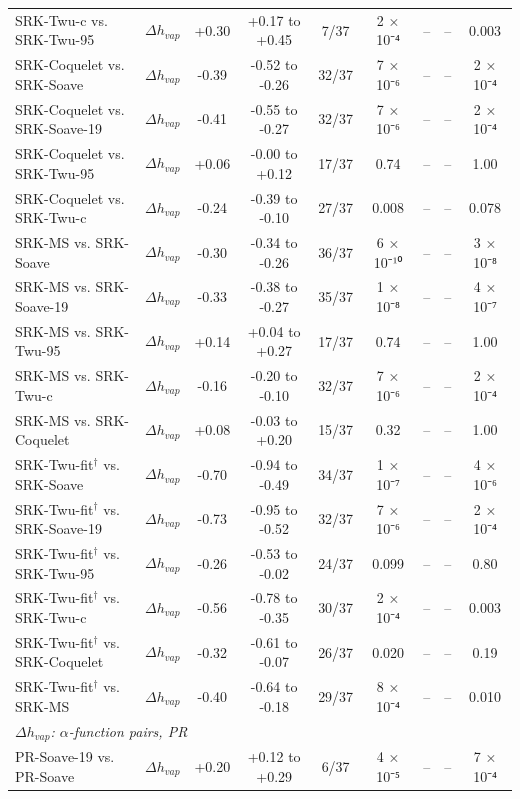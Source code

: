 \begin{table}[H]
\begin{tabular}{llccccccc}
SRK-Twu-c vs. SRK-Twu-95 & $\Delta h_{vap}$ & +0.30 & +0.17 to +0.45 & 7/37 & 2 × 10⁻⁴ & -- & -- & 0.003 \\
SRK-Coquelet vs. SRK-Soave & $\Delta h_{vap}$ & -0.39 & -0.52 to -0.26 & 32/37 & 7 × 10⁻⁶ & -- & -- & 2 × 10⁻⁴ \\
SRK-Coquelet vs. SRK-Soave-19 & $\Delta h_{vap}$ & -0.41 & -0.55 to -0.27 & 32/37 & 7 × 10⁻⁶ & -- & -- & 2 × 10⁻⁴ \\
SRK-Coquelet vs. SRK-Twu-95 & $\Delta h_{vap}$ & +0.06 & -0.00 to +0.12 & 17/37 & 0.74 & -- & -- & 1.00 \\
SRK-Coquelet vs. SRK-Twu-c & $\Delta h_{vap}$ & -0.24 & -0.39 to -0.10 & 27/37 & 0.008 & -- & -- & 0.078 \\
SRK-MS vs. SRK-Soave & $\Delta h_{vap}$ & -0.30 & -0.34 to -0.26 & 36/37 & 6 × 10⁻¹⁰ & -- & -- & 3 × 10⁻⁸ \\
SRK-MS vs. SRK-Soave-19 & $\Delta h_{vap}$ & -0.33 & -0.38 to -0.27 & 35/37 & 1 × 10⁻⁸ & -- & -- & 4 × 10⁻⁷ \\
SRK-MS vs. SRK-Twu-95 & $\Delta h_{vap}$ & +0.14 & +0.04 to +0.27 & 17/37 & 0.74 & -- & -- & 1.00 \\
SRK-MS vs. SRK-Twu-c & $\Delta h_{vap}$ & -0.16 & -0.20 to -0.10 & 32/37 & 7 × 10⁻⁶ & -- & -- & 2 × 10⁻⁴ \\
SRK-MS vs. SRK-Coquelet & $\Delta h_{vap}$ & +0.08 & -0.03 to +0.20 & 15/37 & 0.32 & -- & -- & 1.00 \\
SRK-Twu-fit$^{\dagger}$ vs. SRK-Soave & $\Delta h_{vap}$ & -0.70 & -0.94 to -0.49 & 34/37 & 1 × 10⁻⁷ & -- & -- & 4 × 10⁻⁶ \\
SRK-Twu-fit$^{\dagger}$ vs. SRK-Soave-19 & $\Delta h_{vap}$ & -0.73 & -0.95 to -0.52 & 32/37 & 7 × 10⁻⁶ & -- & -- & 2 × 10⁻⁴ \\
SRK-Twu-fit$^{\dagger}$ vs. SRK-Twu-95 & $\Delta h_{vap}$ & -0.26 & -0.53 to -0.02 & 24/37 & 0.099 & -- & -- & 0.80 \\
SRK-Twu-fit$^{\dagger}$ vs. SRK-Twu-c & $\Delta h_{vap}$ & -0.56 & -0.78 to -0.35 & 30/37 & 2 × 10⁻⁴ & -- & -- & 0.003 \\
SRK-Twu-fit$^{\dagger}$ vs. SRK-Coquelet & $\Delta h_{vap}$ & -0.32 & -0.61 to -0.07 & 26/37 & 0.020 & -- & -- & 0.19 \\
SRK-Twu-fit$^{\dagger}$ vs. SRK-MS & $\Delta h_{vap}$ & -0.40 & -0.64 to -0.18 & 29/37 & 8 × 10⁻⁴ & -- & -- & 0.010 \\
\multicolumn{9}{l}{\emph{$\Delta h_{vap}$: $\alpha$-function pairs, PR}} \\
PR-Soave-19 vs. PR-Soave & $\Delta h_{vap}$ & +0.20 & +0.12 to +0.29 & 6/37 & 4 × 10⁻⁵ & -- & -- & 7 × 10⁻⁴ \\

\end{tabular}
\end{table}

